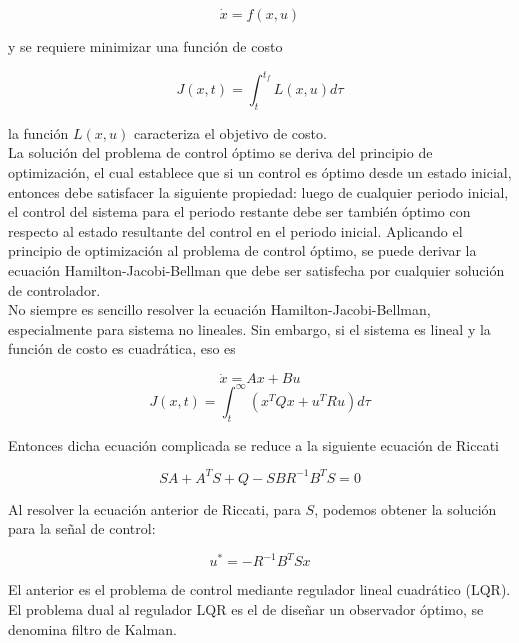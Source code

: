 \begin{equation*}
    \dot{x} = f(x,u)
\end{equation*}

y se requiere minimizar una función de costo

\begin{equation*}
    J(x,t) = \int_{t}^{t_f} L(x,u) d \tau
\end{equation*}

la función $L(x,u)$ caracteriza el objetivo de costo.\\

La solución del problema de control óptimo se deriva del principio de optimización, el cual establece que si un control es óptimo desde un estado inicial, entonces debe satisfacer la siguiente propiedad: luego de cualquier periodo inicial, el control del sistema para el periodo restante debe ser también óptimo con respecto al estado resultante del control en el periodo inicial. Aplicando el principio de optimización al problema de control óptimo, se puede derivar la ecuación Hamilton-Jacobi-Bellman que debe ser satisfecha por cualquier solución de controlador. \\

No siempre es sencillo resolver la ecuación Hamilton-Jacobi-Bellman, especialmente para sistema no lineales. Sin embargo, si el sistema es lineal y la función de costo es cuadrática, eso es

\begin{equation*}
    \dot{x} = A x + B u
\end{equation*}
\begin{equation*}
    J(x,t) = \int_{t}^{\infty} (x^TQ x+u^{T}R u)d \tau
\end{equation*}

Entonces dicha ecuación complicada se reduce a la siguiente ecuación de Riccati

\begin{equation*}
    S A + A^T S + Q - S B R^{-1} B^{T} S = 0
\end{equation*}

Al resolver la ecuación anterior de Riccati, para $S$, podemos obtener la solución para la señal de control:

\begin{equation*}
    u^{*} = - R^{-1} B^{T} S x
\end{equation*}

El anterior es el problema de control mediante regulador lineal cuadrático (LQR). El problema dual al regulador LQR es el de diseñar un observador óptimo, se denomina filtro de Kalman.

